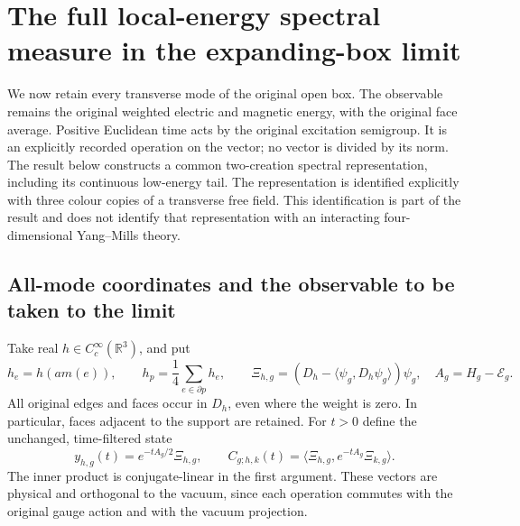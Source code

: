 \section{The full local-energy spectral measure in the expanding-box limit}
\label{sec:full-local-spectrum}

We now retain every transverse mode of the original open box. The
observable remains the original weighted electric and magnetic energy,
with the original face average. Positive Euclidean time acts by the
original excitation semigroup. It is an explicitly recorded operation
on the vector; no vector is divided by its norm. The result below
constructs a common two-creation spectral representation, including its
continuous low-energy tail. The representation is identified explicitly
with three colour copies of a transverse free field. This identification
is part of the result and does not identify that representation with an
interacting four-dimensional Yang--Mills theory.

\subsection{All-mode coordinates and the observable to be taken to the limit}

Take real $h\in C_c^\infty(\mathbb R^3)$, and put
\[
 h_e=h(a m(e)),\qquad h_p=\frac14\sum_{e\in\partial p}h_e,\qquad
 \Xi_{h,g}=(D_h-\langle\psi_g,D_h\psi_g\rangle)\psi_g,
 \quad A_g=H_g-\mathcal E_g .
\]
All original edges and faces occur in $D_h$, even where the weight is
zero. In particular, faces adjacent to the support are retained. For
$t>0$ define the unchanged, time-filtered state
\begin{equation}\label{eq:full-damped-state}
 y_{h,g}(t)=e^{-tA_g/2}\Xi_{h,g},\qquad
 C_{g;h,k}(t)=\langle\Xi_{h,g},e^{-tA_g}\Xi_{k,g}\rangle.
\end{equation}
The inner product is conjugate-linear in the first argument. These
vectors are physical and orthogonal to the vacuum, since each operation
commutes with the original gauge action and with the vacuum projection.

